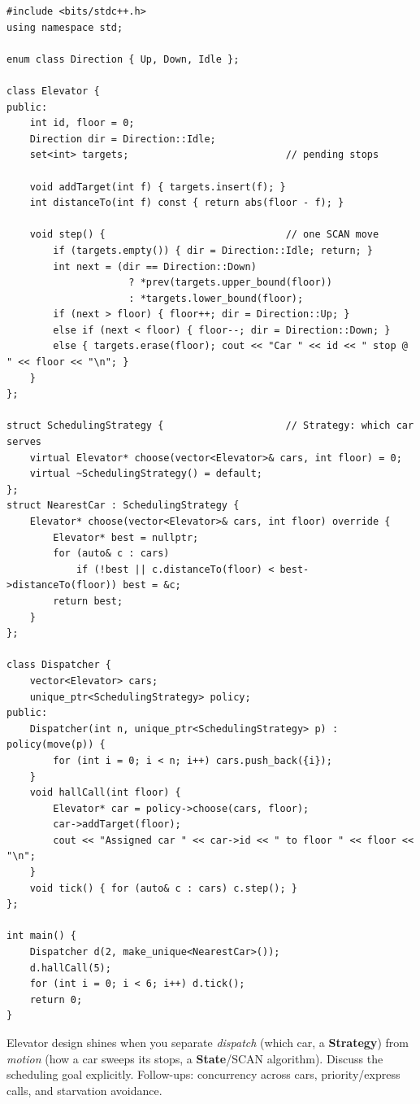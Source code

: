 \begin{lstlisting}
#include <bits/stdc++.h>
using namespace std;

enum class Direction { Up, Down, Idle };

class Elevator {
public:
    int id, floor = 0;
    Direction dir = Direction::Idle;
    set<int> targets;                           // pending stops

    void addTarget(int f) { targets.insert(f); }
    int distanceTo(int f) const { return abs(floor - f); }

    void step() {                               // one SCAN move
        if (targets.empty()) { dir = Direction::Idle; return; }
        int next = (dir == Direction::Down)
                     ? *prev(targets.upper_bound(floor))
                     : *targets.lower_bound(floor);
        if (next > floor) { floor++; dir = Direction::Up; }
        else if (next < floor) { floor--; dir = Direction::Down; }
        else { targets.erase(floor); cout << "Car " << id << " stop @ " << floor << "\n"; }
    }
};

struct SchedulingStrategy {                     // Strategy: which car serves
    virtual Elevator* choose(vector<Elevator>& cars, int floor) = 0;
    virtual ~SchedulingStrategy() = default;
};
struct NearestCar : SchedulingStrategy {
    Elevator* choose(vector<Elevator>& cars, int floor) override {
        Elevator* best = nullptr;
        for (auto& c : cars)
            if (!best || c.distanceTo(floor) < best->distanceTo(floor)) best = &c;
        return best;
    }
};

class Dispatcher {
    vector<Elevator> cars;
    unique_ptr<SchedulingStrategy> policy;
public:
    Dispatcher(int n, unique_ptr<SchedulingStrategy> p) : policy(move(p)) {
        for (int i = 0; i < n; i++) cars.push_back({i});
    }
    void hallCall(int floor) {
        Elevator* car = policy->choose(cars, floor);
        car->addTarget(floor);
        cout << "Assigned car " << car->id << " to floor " << floor << "\n";
    }
    void tick() { for (auto& c : cars) c.step(); }
};

int main() {
    Dispatcher d(2, make_unique<NearestCar>());
    d.hallCall(5);
    for (int i = 0; i < 6; i++) d.tick();
    return 0;
}
\end{lstlisting}

\begin{takeawaybox}
Elevator design shines when you separate \emph{dispatch} (which car, a
\textbf{Strategy}) from \emph{motion} (how a car sweeps its stops, a
\textbf{State}/SCAN algorithm). Discuss the scheduling goal explicitly.
Follow-ups: concurrency across cars, priority/express calls, and
starvation avoidance.
\end{takeawaybox}
